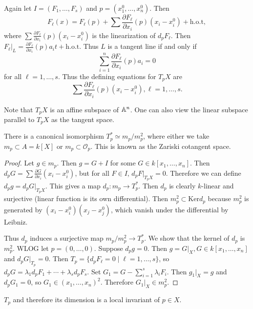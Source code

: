 \documentclass[twoside, 10pt]{article}
\begin{document}
    Again let $I = (F_1, \ldots, F_s)$ and $p = (x_1^0, \ldots, x_n^0)$. Then
    \[F_{\ell}(x) = F_{\ell}(p) + \sum \frac{\partial F_{\ell}}{\partial
    x_i}(p)(x_i - x_i^0) + \mathrm{h.o.t}, \] where $\sum \frac{\partial
F_{\ell}}{\partial x_i}(p)(x_i - x_i^0)$ is the linearization of $d_pF_{\ell}$.
Then $F_{\ell}|_L = \frac{\partial F_{\ell}}{\partial x_i}(p)a_it +
\mathrm{h.o.t}$. Thus $L$ is a tangent line if and only if \[\sum_{i=1}^n
\frac{\partial F_{\ell}}{\partial x_i}(p) a_i = 0 \] for all $\ell = 1, \ldots,
s$. Thus the defining equations for $T_pX$ are \[\sum \frac{\partial
F_{\ell}}{\partial x_i}(p)(x_i - x_i^0), \ell = 1, \ldots, s.\]

    Note that $T_pX$ is an affine subspace of $\mathbb{A}^n$. One can also view the
    linear subspace parallel to $T_pX$ as the tangent space.

    \begin{thm} There is a canonical isomorphism $T_p^* \simeq m_p/m_p^2$,
        where either we take $m_p \subset A = k[X]$ or $m_p \subset
        \mathcal{O}_p$. This is known as the Zariski cotangent space.
        \begin{proof} Let $g \in m_p$. Then $g = G+I$ for some $G \in k[x_1,
            \ldots, x_n]$. Then $d_pG = \sum \frac{\partial G}{\partial
            x_i}(x_i - x_i^0)$, but for all $F \in I$, $d_pF|_{T_pX} = 0$.
            Therefore we can define $d_pg = d_pG|_{T_pX}$. This gives a map
            $d_p: m_p \to T_p^*$. Then $d_p$ is clearly $k$-linear and
            surjective (linear function is its own differential). Then $m_p^2
            \subset \mathrm{Ker}d_p$ because $m_p^2$ is generated by
            $(x_i-x_i^0)(x_j-x_j^0)$, which vanish under the differential by
            Leibniz.

            Thus $d_p$ induces a surjective map $m_p/m_p^2 \to T_p^*$. We show
            that the kernel of $d_p$ is $m_p^2$. WLOG let $p = (0,\ldots, 0)$.
            Suppose $d_p g = 0$. Then $g = G|_X, G \in k[x_1, \ldots, x_n]$ and
            $d_pG|_{T_p} = 0$. Then $T_p = \{d_pF_{\ell} = 0 \mid \ell = 1,
            \ldots, s \}$, so $d_pG = \lambda_1 d_pF_1 + \cdots + \lambda_s d_p
            F_s$. Set $G_1 = G - \sum_{i=1}^s \lambda_i F_i$. Then $g_1|_X = g$
            and $d_p G_1 = 0$, so $G_1 \in (x_1, \ldots, x_n)^2$. Therefore
        $G_1|_X \in m_p^2$.  \end{proof} \end{thm}

    \begin{cor} $T_p$ and therefore its dimension is a local invariant of $p
    \in X$.  \end{cor}
\end{document}
